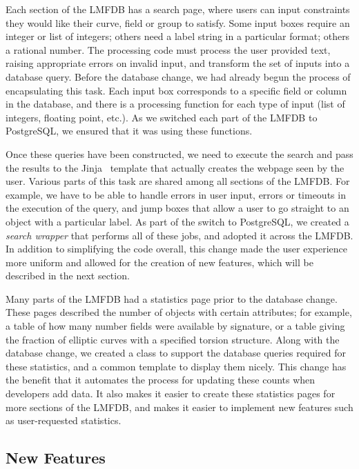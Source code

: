 \documentclass{amsart}
\begin{document}
Each section of the LMFDB has a search page, where users can input constraints they would like their curve, field or group to satisfy.
Some input boxes require an integer or list of integers; others need a label string in a particular format; others a rational number.
The processing code must process the user provided text, raising appropriate errors on invalid input, and transform the set of inputs into a database query.
Before the database change, we had already begun the process of encapsulating this task.
Each input box corresponds to a specific field or column in the database, and there is a processing function for each type of input (list of integers, floating point, etc.).
As we switched each part of the LMFDB to PostgreSQL, we ensured that it was using these functions.

Once these queries have been constructed, we need to execute the search and pass the results to the Jinja~\cite{jinja} template that actually creates the webpage seen by the user.
Various parts of this task are shared among all sections of the LMFDB.
For example, we have to be able to handle errors in user input, errors or timeouts in the execution of the query, and jump boxes that allow a user to go straight to an object with a particular label.
As part of the switch to PostgreSQL, we created a \emph{search wrapper} that performs all of these jobs, and adopted it across the LMFDB.
In addition to simplifying the code overall, this change made the user experience more uniform and allowed for the creation of new features, which will be described in the next section.

Many parts of the LMFDB had a statistics page prior to the database change.
These pages described the number of objects with certain attributes; for example, a table of how many number fields were available by signature, or a table giving the fraction of elliptic curves with a specified torsion structure.
Along with the database change, we created a class to support the database queries required for these statistics, and a common template to display them nicely.
This change has the benefit that it automates the process for updating these counts when developers add data.
It also makes it easier to create these statistics pages for more sections of the LMFDB, and makes it easier to implement new features such as user-requested statistics.

\subsection{New Features}
\end{document}
